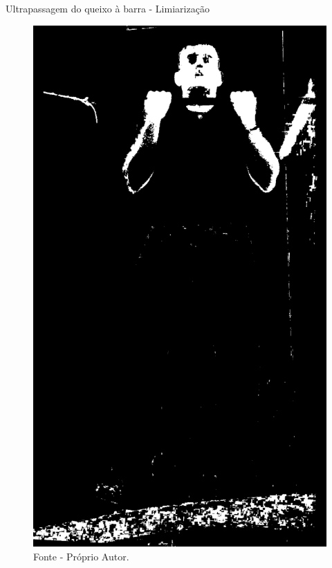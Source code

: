 \begin{frame}{Ultrapassagem do queixo à barra - Limiarização}
    \begin{figure}[!ht]
        \centering
            \includegraphics[scale=0.1]{img/desenvolvimento/ultrapassagemBarra/limited.png}
        \caption*{Fonte - Próprio Autor.}
    \end{figure}
\end{frame}


